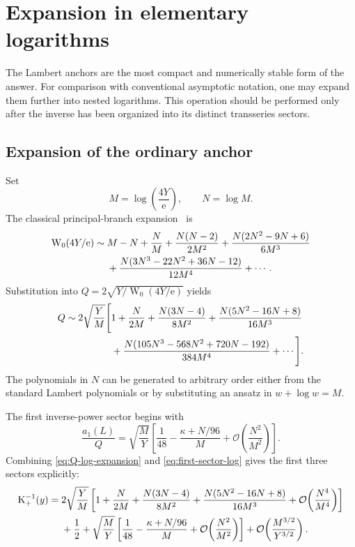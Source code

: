 \documentclass[11pt,oneside]{article}
\theoremstyle{plain}
\theoremstyle{definition}
\theoremstyle{remark}
\newcommand{\Kfun}{\operatorname{K}}
\newcommand{\W}{\operatorname{W}}
\newcommand{\e}{\mathrm{e}}
\newcommand{\BigO}{\mathcal{O}}
\begin{document}
\section{Expansion in elementary logarithms}
\label{sec:pure-log}

The Lambert anchors are the most compact and numerically stable form of the
answer.  For comparison with conventional asymptotic notation, one may expand
them further into nested logarithms.  This operation should be performed only
after the inverse has been organized into its distinct transseries sectors.

\subsection{Expansion of the ordinary anchor}

Set
\begin{equation}
 M=\log\!\left(\frac{4Y}{\e}\right),
 \qquad N=\log M.
 \label{eq:M-N-def}
\end{equation}
The classical principal-branch expansion~\cite{Corless1996} is
\begin{align}
 \W_0(4Y/\e)
 \sim{}&M-N+\frac{N}{M}
 +\frac{N(N-2)}{2M^2}
 +\frac{N(2N^2-9N+6)}{6M^3}
 \notag\\
 &+\frac{N(3N^3-22N^2+36N-12)}{12M^4}
 +\cdots.
 \label{eq:W-log-expansion}
\end{align}
Substitution into \(Q=2\sqrt{Y/\W_0(4Y/\e)}\) yields
\begin{align}
 Q\sim 2\sqrt{\frac{Y}{M}}\Bigg[{}&1+\frac{N}{2M}
 +\frac{N(3N-4)}{8M^2}
 +\frac{N(5N^2-16N+8)}{16M^3}
 \notag\\
 &+\frac{N(105N^3-568N^2+720N-192)}{384M^4}
 +\cdots\Bigg].
 \label{eq:Q-log-expansion}
\end{align}
The polynomials in \(N\) can be generated to arbitrary order either from the
standard Lambert polynomials or by substituting an ansatz in
\(w+\log w=M\).

The first inverse-power sector begins with
\begin{equation}
 \frac{a_1(L)}{Q}
 =\sqrt{\frac{M}{Y}}
 \left[\frac1{48}
 -\frac{\kappa+N/96}{M}
 +\BigO\!\left(\frac{N^2}{M^2}\right)\right].
 \label{eq:first-sector-log}
\end{equation}
Combining \eqref{eq:Q-log-expansion} and
\eqref{eq:first-sector-log} gives the first three sectors explicitly:
\begin{align}
 \Kfun_+^{-1}(y)
 ={}&2\sqrt{\frac{Y}{M}}
 \left[1+\frac{N}{2M}
 +\frac{N(3N-4)}{8M^2}
 +\frac{N(5N^2-16N+8)}{16M^3}
 +\BigO\!\left(\frac{N^4}{M^4}\right)\right]
 \notag\\
 &+\frac12
 +\sqrt{\frac{M}{Y}}
 \left[\frac1{48}
 -\frac{\kappa+N/96}{M}
 +\BigO\!\left(\frac{N^2}{M^2}\right)\right]
 +\BigO\!\left(\frac{M^{3/2}}{Y^{3/2}}\right).
 \label{eq:full-three-sector-log}
\end{align}
\end{document}
